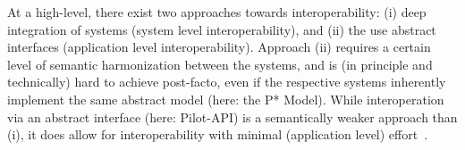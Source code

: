 \documentclass{sig-alternate}
\begin{document}
%
%
% 
% 

At a high-level, there exist two approaches towards interoperability:
(i) deep integration of systems (system level interoperability), and
(ii) the use abstract interfaces (application level interoperability).
Approach (ii) requires a certain level of semantic harmonization
between the systems, and is (in principle and technically) hard to
achieve post-facto, even if the respective systems inherently
implement the same abstract model (here: the P* Model).  While
interoperation via an abstract interface (here: Pilot-API) is a
semantically weaker approach than (i), it does allow for
interoperability with minimal (application level)
effort~\cite{saga_bigjob_condor_cloud,saga_gin}.


\end{document}
